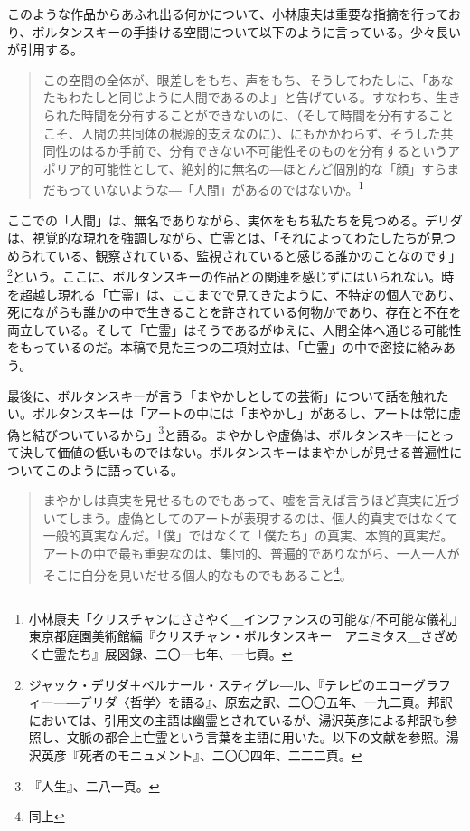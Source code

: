 \documentclass[b5j,twoside,twocolumn]{utarticle}
\begin{document}
このような作品からあふれ出る何かについて、小林康夫は重要な指摘を行っており、ボルタンスキーの手掛ける空間について以下のように言っている。少々長いが引用する。

\begin{quote}
この空間の全体が、眼差しをもち、声をもち、そうしてわたしに、「あなたもわたしと同じように人間であるのよ」と告げている。すなわち、生きられた時間を分有することができないのに、（そして時間を分有することこそ、人間の共同体の根源的支えなのに）、にもかかわらず、そうした共同性のはるか手前で、分有できない不可能性そのものを分有するというアポリア的可能性として、絶対的に無名の―ほとんど個別的な「顔」すらまだもっていないような―「人間」があるのではないか。\footnote{小林康夫「クリスチャンにささやく＿インファンスの可能な/不可能な儀礼」東京都庭園美術館編『クリスチャン・ボルタンスキー　アニミタス＿さざめく亡霊たち』展図録、二〇一七年、一七頁。}

\end{quote}


ここでの「人間」は、無名でありながら、実体をもち私たちを見つめる。デリダは、視覚的な現れを強調しながら、亡霊とは、「それによってわたしたちが見つめられている、観察されている、監視されていると感じる誰かのことなのです」\footnote{ジャック・デリダ＋ベルナール・スティグレ―ル、『テレビのエコーグラフィー—―デリダ〈哲学〉を語る』、原宏之訳、二〇〇五年、一九二頁。邦訳においては、引用文の主語は幽霊とされているが、湯沢英彦による邦訳も参照し、文脈の都合上亡霊という言葉を主語に用いた。以下の文献を参照。湯沢英彦『死者のモニュメント』、二〇〇四年、二二二頁。}という。ここに、ボルタンスキーの作品との関連を感じずにはいられない。時を超越し現れる「亡霊」は、ここまでで見てきたように、不特定の個人であり、死にながらも誰かの中で生きることを許されている何物かであり、存在と不在を両立している。そして「亡霊」はそうであるがゆえに、人間全体へ通じる可能性をもっているのだ。本稿で見た三つの二項対立は、「亡霊」の中で密接に絡みあう。


最後に、ボルタンスキーが言う「まやかしとしての芸術」について話を触れたい。ボルタンスキーは「アートの中には「まやかし」があるし、アートは常に虚偽と結びついているから」\footnote{『人生』、二八一頁。}と語る。まやかしや虚偽は、ボルタンスキーにとって決して価値の低いものではない。ボルタンスキーはまやかしが見せる普遍性についてこのように語っている。
\begin{quote}
まやかしは真実を見せるものでもあって、嘘を言えば言うほど真実に近づいてしまう。虚偽としてのアートが表現するのは、個人的真実ではなくて一般的真実なんだ。「僕」ではなくて「僕たち」の真実、本質的真実だ。アートの中で最も重要なのは、集団的、普遍的でありながら、一人一人がそこに自分を見いだせる個人的なものでもあること\footnote{同上}。
\end{quote}
\end{document}
